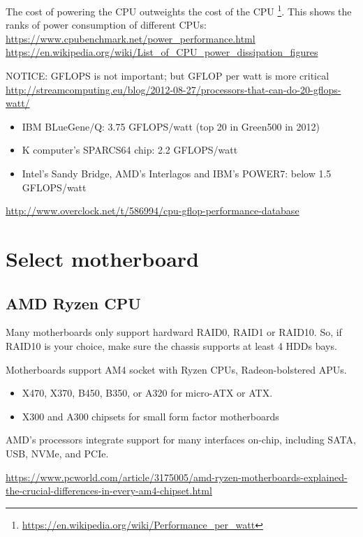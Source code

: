 The cost of powering the CPU outweights the cost of the CPU 
\footnote{\url{https://en.wikipedia.org/wiki/Performance_per_watt}}.
This shows the ranks of power consumption of different CPUs:
\url{https://www.cpubenchmark.net/power_performance.html}
\url{https://en.wikipedia.org/wiki/List_of_CPU_power_dissipation_figures}
  
NOTICE: GFLOPS is not important; but GFLOP per watt is more critical
  \url{http://streamcomputing.eu/blog/2012-08-27/processors-that-can-do-20-gflops-watt/}

\begin{itemize}
  \item IBM BLueGene/Q: 3.75 GFLOPS/watt (top 20 in Green500 in 2012)
  
  \item K computer's SPARCS64 chip: 2.2 GFLOPS/watt
  
  \item Intel's Sandy Bridge, AMD's Interlagos and IBM's POWER7: below 1.5
  GFLOPS/watt
\end{itemize}  
\url{http://www.overclock.net/t/586994/cpu-gflop-performance-database}


\section{Select motherboard}
\label{sec:NAS-motherboard}


\subsection{AMD Ryzen CPU}

Many motherboards only support hardward RAID0, RAID1 or RAID10. 
So, if RAID10 is your choice, make sure the chassis supports at least 4 HDDs bays.


Motherboards support AM4 socket with Ryzen
CPUs, Radeon-bolstered APUs.
\begin{itemize}
  
  \item X470, X370, B450, B350, or A320 for micro-ATX or ATX.
  
  \item X300 and A300 chipsets for small form factor motherboards
  
\end{itemize}
AMD’s processors integrate support for many interfaces on-chip, including SATA, USB, NVMe, and PCIe.

\url{https://www.pcworld.com/article/3175005/amd-ryzen-motherboards-explained-the-crucial-differences-in-every-am4-chipset.html}

